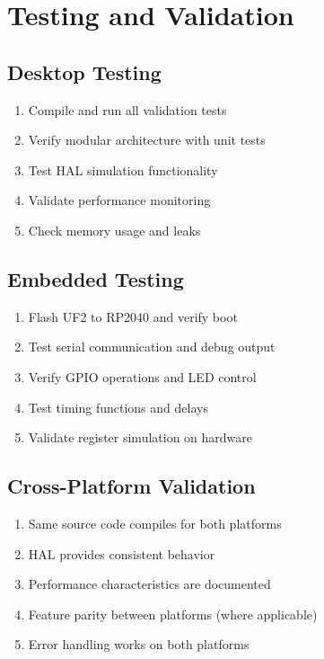 \documentclass[11pt,a4paper]{article}
\begin{document}
\section{Testing and Validation}

\subsection{Desktop Testing}
\begin{enumerate}
    \item Compile and run all validation tests
    \item Verify modular architecture with unit tests
    \item Test HAL simulation functionality
    \item Validate performance monitoring
    \item Check memory usage and leaks
\end{enumerate}

\subsection{Embedded Testing}
\begin{enumerate}
    \item Flash UF2 to RP2040 and verify boot
    \item Test serial communication and debug output
    \item Verify GPIO operations and LED control
    \item Test timing functions and delays
    \item Validate register simulation on hardware
\end{enumerate}

\subsection{Cross-Platform Validation}
\begin{enumerate}
    \item Same source code compiles for both platforms
    \item HAL provides consistent behavior
    \item Performance characteristics are documented
    \item Feature parity between platforms (where applicable)
    \item Error handling works on both platforms
\end{enumerate}
\end{document}
